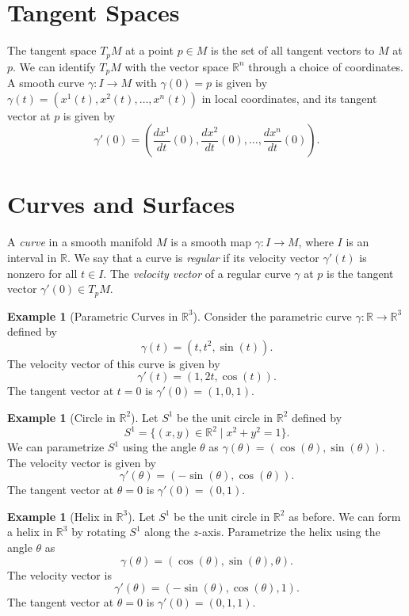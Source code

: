 \documentclass{article}
\theoremstyle{definition}
\newtheorem{example}[definition]{Example}
\numberwithin{equation}{section}
\begin{document}
\section{Tangent Spaces}
The tangent space $T_pM$ at a point $p \in M$ is the set of all tangent vectors to $M$ at $p$. We can identify $T_pM$ with the vector space $\mathbb{R}^n$ through a choice of coordinates. A smooth curve $\gamma: I \to M$ with $\gamma(0) = p$ is given by $\gamma(t) = (x^1(t), x^2(t), \ldots, x^n(t))$ in local coordinates, and its tangent vector at $p$ is given by
$$\gamma'(0) = \left(\frac{dx^1}{dt}(0), \frac{dx^2}{dt}(0), \ldots, \frac{dx^n}{dt}(0)\right).$$
\section{Curves and Surfaces}
A \textit{curve} in a smooth manifold $M$ is a smooth map $\gamma: I \to M$, where $I$ is an interval in $\mathbb{R}$. We say that a curve is \textit{regular} if its velocity vector $\gamma'(t)$ is nonzero for all $t \in I$. The \textit{velocity vector} of a regular curve $\gamma$ at $p$ is the tangent vector $\gamma'(0) \in T_pM$.

\begin{example}[Parametric Curves in $\mathbb{R}^3$]
Consider the parametric curve $\gamma: \mathbb{R} \to \mathbb{R}^3$ defined by
\[\gamma(t) = (t, t^2, \sin(t)).\]
The velocity vector of this curve is given by
\begin{equation}\label{eq:parametric_curve}
\gamma'(t) = (1, 2t, \cos(t)).
\end{equation}
The tangent vector at $t = 0$ is $\gamma'(0) = (1, 0, 1)$. \cite{do-carmo}
\end{example}

\begin{example}[Circle in $\mathbb{R}^2$]
Let $S^1$ be the unit circle in $\mathbb{R}^2$ defined by
\[S^1 = \{(x, y) \in \mathbb{R}^2 \mid x^2 + y^2 = 1\}.\]
We can parametrize $S^1$ using the angle $\theta$ as $\gamma(\theta) = (\cos(\theta), \sin(\theta))$. The velocity vector is given by
\begin{equation}\label{eq:circle}
\gamma'(\theta) = (-\sin(\theta), \cos(\theta)).
\end{equation}
The tangent vector at $\theta = 0$ is $\gamma'(0) = (0, 1)$.
\end{example}

\begin{example}[Helix in $\mathbb{R}^3$]
Let $S^1$ be the unit circle in $\mathbb{R}^2$ as before. We can form a helix in $\mathbb{R}^3$ by rotating $S^1$ along the $z$-axis. Parametrize the helix using the angle $\theta$ as
\[\gamma(\theta) = (\cos(\theta), \sin(\theta), \theta).\]
The velocity vector is
\begin{equation}\label{eq:helix}
\gamma'(\theta) = (-\sin(\theta), \cos(\theta), 1).
\end{equation}
The tangent vector at $\theta = 0$ is $\gamma'(0) = (0, 1, 1)$.
\end{example}
\end{document}
